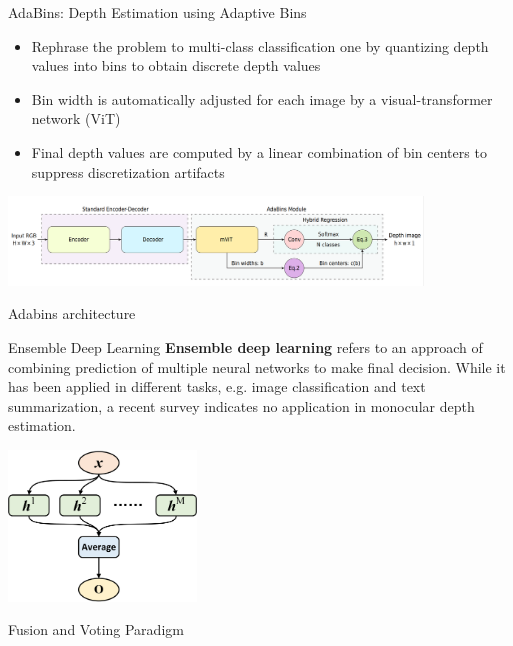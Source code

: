 \documentclass[10pt]{beamer}
\begin{document}
\begin{frame}{AdaBins: Depth Estimation using Adaptive Bins}
    \begin{itemize}
        \item Rephrase the problem to multi-class classification one by quantizing depth values into bins to obtain discrete depth values
        \item Bin width is automatically adjusted for each image by a visual-transformer network (ViT)
        \item Final depth values are computed by a linear combination of bin centers to suppress discretization artifacts
    \end{itemize}
    \smallskip
    \centering
    \includegraphics[width=11cm]{adabins_architecture.png}\par
    Adabins architecture \cite{adabins}
\end{frame}

\begin{frame}{Ensemble Deep Learning}
    \textbf{Ensemble deep learning} refers to an approach of combining prediction of multiple neural networks to make final decision. While it has been applied in different tasks, e.g. image classification and text summarization, a recent survey indicates no application in monocular depth estimation.
    
    \vspace{0.3cm} 
    \centering
    \includegraphics[width=5cm]{ensemble_fusion.png}\par
    Fusion and Voting Paradigm
\end{frame}
\end{document}
